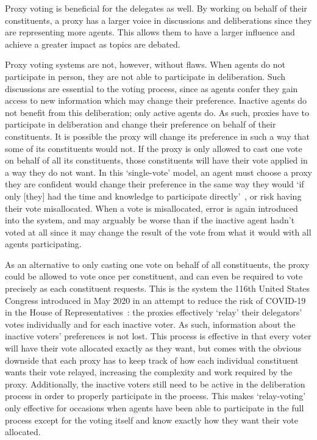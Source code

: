 Proxy voting is beneficial for the delegates as well.
By working on behalf of their constituents, a proxy has a larger voice in discussions
and deliberations since they are representing more agents.
This allows them to have a larger influence and achieve a greater impact as topics
are debated.

Proxy voting systems are not, however, without flaws.
When agents do not participate in person, they are not able to participate in
deliberation.
Such discussions are essential to the voting process, since as agents confer they
gain access to new information which may change their preference.
Inactive agents do not benefit from this deliberation;
only active agents do.
As such, proxies have to participate in deliberation and change their preference on
behalf of their constituents.
It is possible the proxy will change its preference in such a way that some of its
constituents would not.
If the proxy is only allowed to cast one vote on behalf of all its constituents, those
constituents will have their vote applied in a way they do not want.
In this `single-vote' model, an agent must choose a proxy they are confident would
change their preference in the same way they would `if only [they] had the time and
knowledge to participate directly'~\cite{Miller1969}, or risk having their vote
misallocated.
When a vote is misallocated, error is again introduced into the system, and may
arguably be worse than if the inactive agent hadn't voted at all since it may change
the result of the vote from what it would with all agents participating.

As an alternative to only casting one vote on behalf of all constituents, the proxy
could be allowed to vote once per constituent, and can even be required to vote
precisely as each constituent requests.
This is the system the 116th United States Congress introduced in May 2020 in an
attempt to reduce the risk of COVID-19 in the House of
Representatives~\cite{CERP2020, Congress.gov2020}: the proxies effectively `relay' their
delegators' votes individually and for each inactive voter.
As such, information about the inactive voters' preferences is not lost.
This process is effective in that every voter will have their vote allocated exactly
as they want, but comes with the obvious downside that each proxy has to keep track
of how each individual constituent wants their vote relayed, increasing the
complexity and work required by the proxy.
Additionally, the inactive voters still need to be active in the deliberation process
in order to properly participate in the process.
This makes `relay-voting' only effective for occasions when agents have been able to
participate in the full process except for the voting itself and know exactly how
they want their vote allocated.

